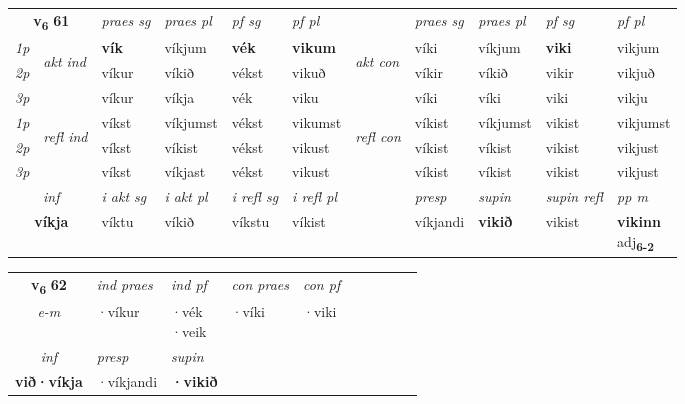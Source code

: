 \noindent
\begin{tabular}{lllllllllll} \toprule
\multicolumn{2}{c}{\textbf{v{\textsubscript{6}}} \Large{\textbf{61}}}  &  \textit{praes sg}  & \textit{praes pl}  &\textit{ pf sg} & \textit{pf pl} &  &  \textit{praes sg}  & \textit{praes pl}  & \textit{pf sg} & \textit{pf pl } \\*
	\cmidrule{3-6} \cmidrule{8-11}
 {\textit{1p}} & \multirow{3}{*}{\begin{turn}{90}\textit{akt ind}\end{turn}} & \textbf{vík} & víkjum & \textbf{vék} & \textbf{vikum} & \multirow{3}{*}{\begin{turn}{90}\textit{akt con}\end{turn}} &víki & víkjum & \textbf{viki} & vikjum\\*
 {\textit{2p}} &  &  víkur  & víkið & vékst & vikuð & & víkir & víkið & vikir & vikjuð \\*
{\textit{3p}} &  & víkur & víkja & vék & viku & & víki & víki& viki & vikju \\*
\cmidrule{3-6} \cmidrule{8-11}
 {\textit{1p}} & \multirow{3}{*}{\begin{turn}{90}\textit{refl ind}\end{turn}}  & víkst & víkjumst & vékst & vikumst & \multirow{3}{*}{\begin{turn}{90}\textit{refl con}\end{turn}}  &víkist & víkjumst & vikist & vikjumst \\*
 {\textit{2p}} &  & víkst & víkist & vékst & vikust & &víkist & víkist & vikist & vikjust \\*
 {\textit{3p}}  & & víkst & víkjast & vékst & vikust & & víkist & víkist& vikist & vikjust \\*
\cmidrule{3-6} \cmidrule{8-11}

   \multicolumn{2}{c}{\textit{inf}}  & \textit{i akt sg} & \textit{i akt pl} & \textit{i refl sg} & \textit{i refl pl} && \textit{presp} & \textit{supin} & \textit{supin refl} & \textit{pp m} \\*
  \multicolumn{2}{c}{\textbf{víkja}} & víktu  & víkið & víkstu & víkist && víkjandi &  \textbf{vikið} & vikist & \specialcell{\textbf{vikinn} \\ adj\textbf{\textsubscript{6-2}}} \\*
\end{tabular}

\noindent
\begin{tabular}{lllllllllll} \toprule
\multicolumn{2}{c}{\textbf{v{\textsubscript{6}}} \Large{\textbf{62}}}  &  \textit{ind praes} & \textit{ind pf} & \textit{con praes} & \textit{con pf} \\*
\multicolumn{2}{c}{ \textit{e-m} } & ·víkur & \specialcell{·vék\\  ·veik} & ·víki & ·viki \\*

\cmidrule{3-4}
   \multicolumn{2}{c}{\textit{inf}}     & \textit{presp} & \textit{supin}   \\*
  \multicolumn{2}{c}{\textbf{við\allowbreak ·víkja}}      & ·víkjandi &  \textbf{·vikið}   \\*
\end{tabular}

